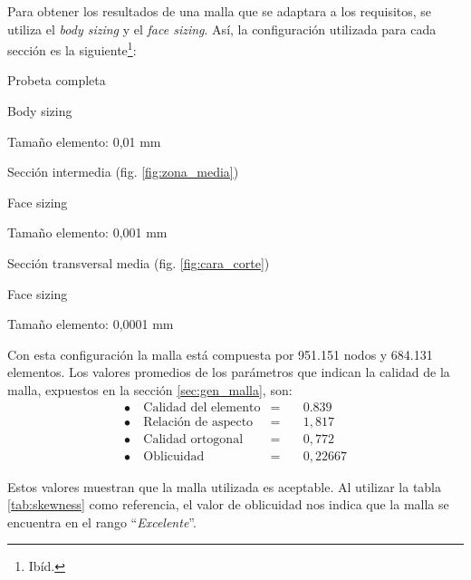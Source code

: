 Para obtener los resultados de una malla que se adaptara a los requisitos, se utiliza el \textit{body sizing} y el \textit{face sizing}. Así, la configuración utilizada para cada sección es la siguiente\footnote{Ibíd.}:
\begin{itemize*}
	\item Probeta completa
		\begin{itemize*}
			\item Body sizing
			\item Tamaño elemento: 0,01 mm
		\end{itemize*}
	\item Sección intermedia (fig. \ref{fig:zona_media})
		\begin{itemize*}
			\item Face sizing
			\item Tamaño elemento: 0,001 mm
		\end{itemize*}
	\item Sección transversal media (fig. \ref{fig:cara_corte})
		\begin{itemize*}
			\item Face sizing
			\item Tamaño elemento: 0,0001 mm
		\end{itemize*}
\end{itemize*}

\newpage

Con esta configuración la malla está compuesta por 951.151 nodos y 684.131 elementos. Los valores promedios de los parámetros que indican la calidad de la malla, expuestos en la sección \ref{sec:gen_malla}, son:
\begin{align*}
	\bullet \ &\text{Calidad del elemento} &=\quad	 &0.839 	\\
	\bullet \ &\text{Relación de aspecto}  &=\quad 	 &1,817 	\\
	\bullet \ &\text{Calidad ortogonal} 	 &=\quad 	 &0,772 	\\
	\bullet \ &\text{Oblicuidad} 			 &=\quad	 &0,22667
\end{align*}

Estos valores muestran que la malla utilizada es aceptable. Al utilizar la tabla \ref{tab:skewness} como referencia, el valor de oblicuidad nos indica que la malla se encuentra en el rango ``\textit{Excelente}''.

